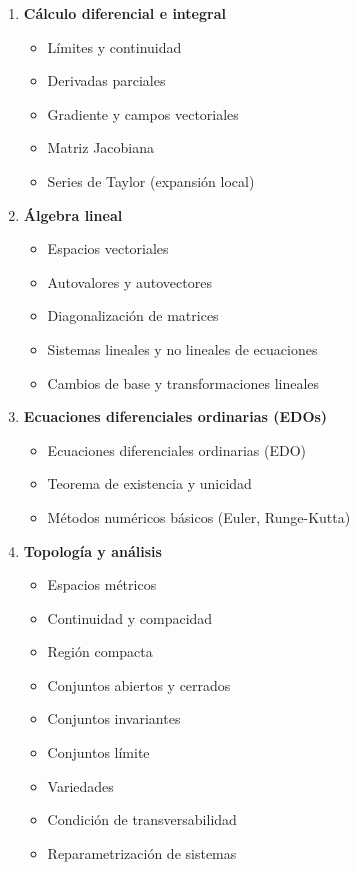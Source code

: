 \begin{enumerate}
	\item \textbf{Cálculo diferencial e integral}
	\begin{itemize}
		\item Límites y continuidad
		\item Derivadas parciales
		\item Gradiente y campos vectoriales
		\item Matriz Jacobiana
		\item Series de Taylor (expansión local)
	\end{itemize}
	
	\item \textbf{Álgebra lineal}
	\begin{itemize}
		\item Espacios vectoriales
		\item Autovalores y autovectores \checkmark
		\item Diagonalización de matrices \checkmark
		\item Sistemas lineales y no lineales de ecuaciones \checkmark
		\item Cambios de base y transformaciones lineales
	\end{itemize}
	
	\item \textbf{Ecuaciones diferenciales ordinarias (EDOs)}
	\begin{itemize}
		\item Ecuaciones diferenciales ordinarias (EDO) \checkmark
		\item Teorema de existencia y unicidad \checkmark
		\item Métodos numéricos básicos (Euler, Runge-Kutta)
	\end{itemize}
	
	\item \textbf{Topología y análisis}
	\begin{itemize}
		\item Espacios métricos
		\item Continuidad y compacidad
		\item Región compacta
		\item Conjuntos abiertos y cerrados
		\item Conjuntos invariantes
		\item Conjuntos límite
		\item Variedades
		\item Condición de transversabilidad
		\item Reparametrización de sistemas
	\end{itemize}
	

\end{enumerate}
